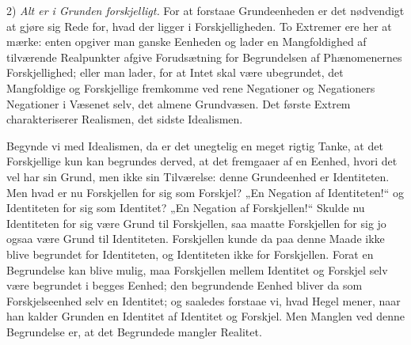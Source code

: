 \documentclass[11pt]{book}
\newcommand{\opage}[1]{\marginnote{\footnotesize\textit{[#1]}}}
\begin{document}
2) \emph{Alt er i Grunden forskjelligt.} For at forstaae
Grundeenheden er det nødvendigt at gjøre sig Rede for, hvad der
ligger i Forskjelligheden. To Extremer ere her at mærke: enten
opgiver man ganske Eenheden og lader en Mangfoldighed af tilværende
Realpunkter afgive Forudsætning for Begrundelsen af Phænomenernes
Forskjellighed; eller man lader, for at Intet skal være
ubegrundet, det Mangfoldige og Forskjellige fremkomme ved rene
Negationer og Negationers Negationer i Væsenet selv, det almene
Grundvæsen. Det første Extrem charakteriserer Realismen, det
sidste Idealismen.

Begynde vi med Idealismen, da er det unegtelig en meget rigtig
Tanke, at det Forskjellige kun kan begrundes derved, at det
fremgaaer af en Eenhed, hvori det vel har sin Grund, men ikke sin
Tilværelse: denne Grundeenhed er Identiteten. Men hvad er nu
Forskjellen for sig som Forskjel? „En Negation af Identiteten!“ og
Identiteten for sig som Identitet? „En Negation af Forskjellen!“
Skulde nu Identiteten for sig være Grund til Forskjellen, saa
maatte Forskjellen for sig jo ogsaa være Grund til Identiteten.
Forskjellen kunde da paa denne Maade ikke blive begrundet for
Identiteten, og Identiteten ikke for Forskjellen. Forat en
Begrundelse kan blive mulig, maa Forskjellen mellem Identitet og
Forskjel selv være begrundet i begges Eenhed; den begrundende
Eenhed bliver da som Forskjelseenhed selv en Identitet; og saaledes
forstaae vi, hvad Hegel mener, naar han kalder Grunden en Identitet
af Identitet og Forskjel.
\opage{97} \setcounter{footnote}{0}%
Men Manglen ved denne Begrundelse er, at det Begrundede mangler
Realitet.
\end{document}
